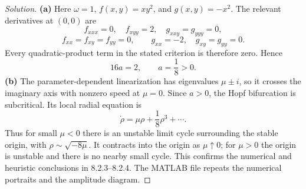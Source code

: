 \documentclass[10pt]{amsart}
\newenvironment{solution}
{\begin{proof}[Solution]}
{\end{proof}}
\begin{document}
\begin{onehalfspace}
\begin{solution}
\textbf{(a)} Here $\omega=1$, $f(x,y)=xy^2$, and $g(x,y)=-x^2$. The relevant derivatives at $(0,0)$ are
\[
 f_{xxx}=0,\quad f_{xyy}=2,\quad g_{xxy}=g_{yyy}=0,
\]
\[
 f_{xx}=f_{xy}=f_{yy}=0,\qquad
 g_{xx}=-2,\quad g_{xy}=g_{yy}=0.
\]
Every quadratic-product term in the stated criterion is therefore zero. Hence
\[
 16a=2,\qquad a=\frac18>0.
\]
\textbf{(b)} The parameter-dependent linearization has eigenvalues $\mu\pm i$, so it crosses the imaginary axis with nonzero speed at $\mu=0$. Since $a>0$, the Hopf bifurcation is subcritical. Its local radial equation is
\[
 \dot\rho=\mu\rho+\frac18\rho^3+\cdots.
\]
Thus for small $\mu<0$ there is an unstable limit cycle surrounding the stable origin, with $\rho\sim\sqrt{-8\mu}$. It contracts into the origin as $\mu\uparrow0$; for $\mu>0$ the origin is unstable and there is no nearby small cycle. This confirms the numerical and heuristic conclusions in 8.2.3--8.2.4. The MATLAB file repeats the numerical portraits and the amplitude diagram.


\end{solution}
\end{onehalfspace}
\end{document}
